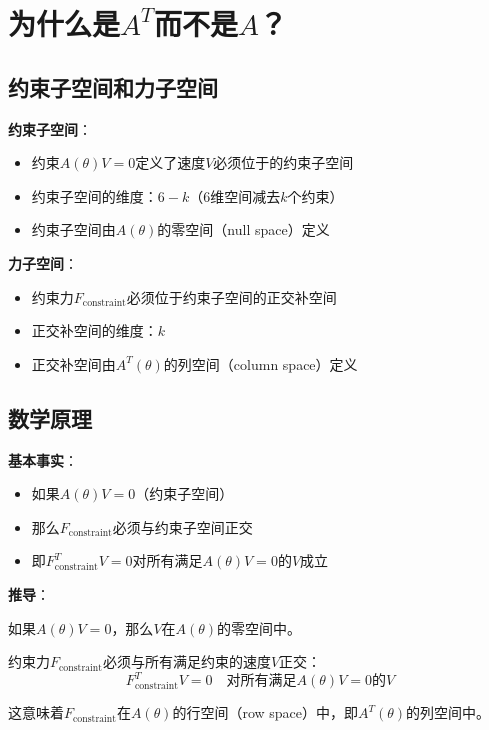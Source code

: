 \documentclass[12pt,a4paper]{article}
\begin{document}
\section{为什么是$A^T$而不是$A$？}

\subsection{约束子空间和力子空间}

\textbf{约束子空间}：
\begin{itemize}
\item 约束$A(\theta)V = 0$定义了速度$V$必须位于的约束子空间
\item 约束子空间的维度：$6 - k$（6维空间减去$k$个约束）
\item 约束子空间由$A(\theta)$的零空间（null space）定义
\end{itemize}

\textbf{力子空间}：
\begin{itemize}
\item 约束力$F_{\text{constraint}}$必须位于约束子空间的正交补空间
\item 正交补空间的维度：$k$
\item 正交补空间由$A^T(\theta)$的列空间（column space）定义
\end{itemize}

\subsection{数学原理}

\textbf{基本事实}：
\begin{itemize}
\item 如果$A(\theta)V = 0$（约束子空间）
\item 那么$F_{\text{constraint}}$必须与约束子空间正交
\item 即$F_{\text{constraint}}^T V = 0$对所有满足$A(\theta)V = 0$的$V$成立
\end{itemize}

\textbf{推导}：

如果$A(\theta)V = 0$，那么$V$在$A(\theta)$的零空间中。

约束力$F_{\text{constraint}}$必须与所有满足约束的速度$V$正交：
\begin{equation}
F_{\text{constraint}}^T V = 0 \quad \text{对所有满足$A(\theta)V = 0$的$V$}
\end{equation}

这意味着$F_{\text{constraint}}$在$A(\theta)$的行空间（row space）中，即$A^T(\theta)$的列空间中。
\end{document}

